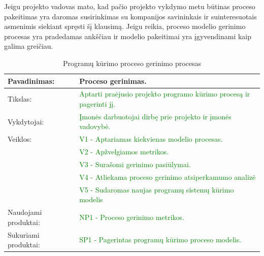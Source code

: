 \documentclass{VUMIFPSkursinis}
\begin{document}
				Jeigu projekto vadovas mato, kad pačio projekto vykdymo metu būtinas proceso pakeitimas yra daromas susirinkimas su kompanijos savininkais ir suinteresuotais asmenimis siekiant spręsti šį klausimą. 
				Jeigu reikia, proceso modelio gerinimo procesas yra pradedamas ankščiau ir modelio pakeitimai yra įgyvendinami kaip galima greičiau.
	\begin{center}
		\begin{table}[ht]
			\caption{Programų kūrimo proceso gerinimo procesas}
			\begin{tabular}{ | l | l | }
				\hline
				Pavadinimas:		& Proceso gerinimas.						\\ \hline
				Tikslas:		& \textcolor{green}{Aptarti praėjusio projekto programo kūrimo procesą ir pagerinti jį.}			\\ \hline
				Vykdytojai:		&\textcolor{green}{ Įmonės darbuotojai dirbę prie projekto ir įmonės vadovybė.}					\\ \hline
				Veiklos:		& \textcolor{green}{V1 - Aptariamas kiekvienas modelio procesas.} 				\\
							& \textcolor{green}{V2 - Apžvelgiamos metrikos.}	\\
							& \textcolor{green}{V3 - Surašomi gerinimo pasiūlymai.}				\\ 
							& \textcolor{green}{V4 - Atliekama proceso gerinimo atsiperkamumo analizė} \\ 
							& \textcolor{green}{V5 - Sudaromas naujas programų sistemų kūrimo modelis} \\ \hline
				Naudojami produktai:	& \textcolor{green}{NP1 - Proceso gerinimo metrikos. }				\\ \hline
				Sukuriami produktai:	& \textcolor{green}{SP1 - Pagerintas programų kūrimo proceso modelis.}		\\ \hline
			\end{tabular}
		\end{table}
	\end{center}
\end{document}

